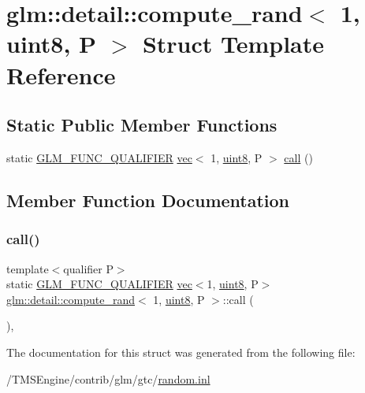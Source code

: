 \hypertarget{structglm_1_1detail_1_1compute__rand_3_011_00_01uint8_00_01_p_01_4}{}\section{glm\+:\+:detail\+:\+:compute\+\_\+rand$<$ 1, uint8, P $>$ Struct Template Reference}
\label{structglm_1_1detail_1_1compute__rand_3_011_00_01uint8_00_01_p_01_4}
\subsection*{Static Public Member Functions}
\begin{DoxyCompactItemize}
\item 
static \hyperlink{setup_8hpp_a33fdea6f91c5f834105f7415e2a64407}{G\+L\+M\+\_\+\+F\+U\+N\+C\+\_\+\+Q\+U\+A\+L\+I\+F\+I\+ER} \hyperlink{structglm_1_1vec}{vec}$<$ 1, \hyperlink{namespaceglm_1_1detail_aef2588f97d090cc19fbbe0c74fe17c8f}{uint8}, P $>$ \hyperlink{structglm_1_1detail_1_1compute__rand_3_011_00_01uint8_00_01_p_01_4_a9391c8df40318095dabaf29789a665aa}{call} ()
\end{DoxyCompactItemize}


\subsection{Member Function Documentation}
\mbox{\label{structglm_1_1detail_1_1compute__rand_3_011_00_01uint8_00_01_p_01_4_a9391c8df40318095dabaf29789a665aa}} 
\subsubsection{\texorpdfstring{call()}{call()}}
{\footnotesize\ttfamily template$<$qualifier P$>$ \\
static \hyperlink{setup_8hpp_a33fdea6f91c5f834105f7415e2a64407}{G\+L\+M\+\_\+\+F\+U\+N\+C\+\_\+\+Q\+U\+A\+L\+I\+F\+I\+ER} \hyperlink{structglm_1_1vec}{vec}$<$1, \hyperlink{namespaceglm_1_1detail_aef2588f97d090cc19fbbe0c74fe17c8f}{uint8}, P$>$ \hyperlink{structglm_1_1detail_1_1compute__rand}{glm\+::detail\+::compute\+\_\+rand}$<$ 1, \hyperlink{namespaceglm_1_1detail_aef2588f97d090cc19fbbe0c74fe17c8f}{uint8}, P $>$\+::call (\begin{DoxyParamCaption}{ }\end{DoxyParamCaption})\hspace{0.3cm}{\ttfamily [inline]}, {\ttfamily [static]}}



The documentation for this struct was generated from the following file\+:\begin{DoxyCompactItemize}
\item 
/\+T\+M\+S\+Engine/contrib/glm/gtc/\hyperlink{random_8inl}{random.\+inl}\end{DoxyCompactItemize}
